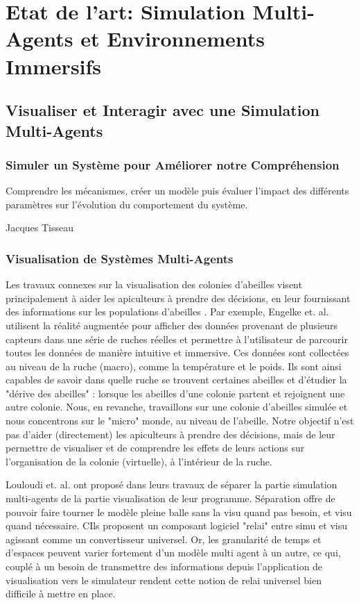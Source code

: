 \chapter{Etat de l'art: Simulation Multi-Agents et Environnements Immersifs}
	\section{Visualiser et Interagir avec une Simulation Multi-Agents}
		\subsection{Simuler un Système pour Améliorer notre Compréhension}
		
		Comprendre les mécanismes, créer un modèle puis évaluer l'impact des différents paramètres sur l'évolution du comportement du système.
		
		Jacques Tisseau
		\subsection{Visualisation de Systèmes Multi-Agents}
		
		Les travaux connexes sur la visualisation des colonies d'abeilles visent principalement à aider les apiculteurs à prendre des décisions, en leur fournissant des informations sur les populations d'abeilles \cite{engelke_visual_2016, engelke_melissar_2016, nguyen_augmented_2017}. Par exemple, Engelke et. al. \cite{engelke_visual_2016} utilisent la réalité augmentée pour afficher des données provenant de plusieurs capteurs dans une série de ruches réelles et permettre à l'utilisateur de parcourir toutes les données de manière intuitive et immersive. Ces données sont collectées au niveau de la ruche (macro), comme la température et le poids. Ils sont ainsi capables de savoir dans quelle ruche se trouvent certaines abeilles et d'étudier la "dérive des abeilles" : lorsque les abeilles d'une colonie partent et rejoignent une autre colonie. Nous, en revanche, travaillons sur une colonie d'abeilles simulée et nous concentrons sur le "micro" monde, au niveau de l'abeille. Notre objectif n'est pas d'aider (directement) les apiculteurs à prendre des décisions, mais de leur permettre de visualiser et de comprendre les effets de leurs actions sur l'organisation de la colonie (virtuelle), à l'intérieur de la ruche.
		
		Louloudi et. al. \cite{louloudi_new_2012} ont proposé dans leurs travaux de séparer la partie simulation multi-agents de la partie visualisation de leur programme. Séparation offre de pouvoir faire tourner le modèle pleine balle sans la visu quand pas besoin, et visu quand nécessaire. CIls proposent un composant logiciel "relai" entre simu et visu agissant comme un convertisseur universel. Or, les granularité de temps et d'espaces peuvent varier fortement d'un modèle multi agent à un autre, ce qui, couplé à un besoin de transmettre des informations depuis l'application de visualisation vers le simulateur rendent cette notion de relai universel bien difficile à mettre en place.
		
